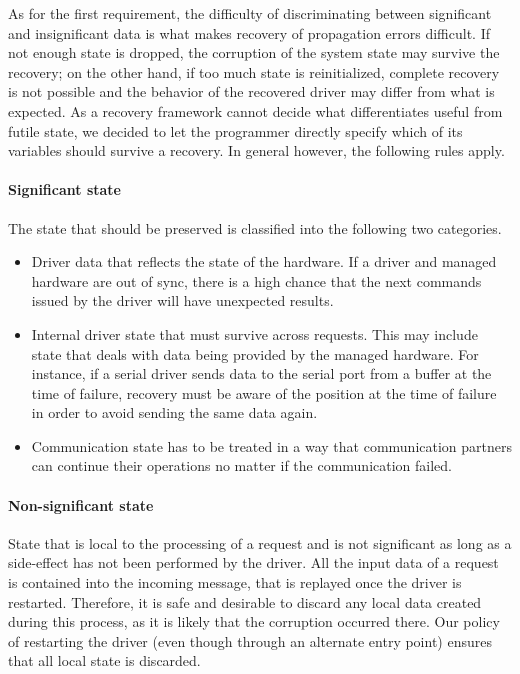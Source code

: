 \documentclass{acm_proc_article-sp}
\begin{document}
As for the first requirement, the difficulty of discriminating between significant and insignificant data is what makes recovery of propagation errors difficult. If not enough state is dropped, the corruption of the system state may survive the recovery; on the other hand, if too much state is reinitialized, complete recovery is not possible and the behavior of the recovered driver may differ from what is expected. As a recovery framework cannot decide what differentiates useful from futile state, we decided to let the programmer directly specify which of its variables should survive a recovery. In general however, the following rules apply.

\paragraph{Significant state}
The state that should be preserved is classified into the following two categories.
\begin{itemize}
\item Driver data that reflects the state of the hardware.  If a driver and managed hardware are out of sync, there is a high chance that the next commands issued by the driver will have unexpected results.
\item Internal driver state that must survive across requests. This may include state that deals with data being provided by the managed hardware. For instance, if a serial driver sends data to the serial port from a buffer at the time of failure, recovery must be aware of the position at the time of failure in order to avoid sending the same data again.
\item Communication state has to be treated in a way that communication partners can continue their operations no matter if the communication failed.
\end{itemize}

\paragraph{Non-significant state}
State that is local to the processing of a request and is not significant as long as a side-effect has not been performed by the driver. All the input data of a request is contained into the incoming message, that is replayed once the driver is restarted. Therefore, it is safe and desirable to discard any local data created during this process, as it is likely that the corruption occurred there. Our policy of restarting the driver (even though through an alternate entry point) ensures that all local state is discarded.
\end{document}
